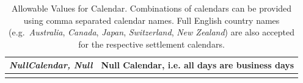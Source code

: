 \begin{longtable}{| p{} | p{} |}
    \emph{NullCalendar, Null} & Null Calendar, i.e. all days are business days \\ \hline                 
  \caption{Allowable Values for Calendar. Combinations of calendars can be provided using comma separated calendar names. Full English country names (e.g.\ \emph{Australia}, \emph{Canada}, \emph{Japan}, \emph{Switzerland}, \emph{New Zealand}) are also accepted for the respective settlement calendars.}
  \label{tab:calendar}
\end{longtable}

